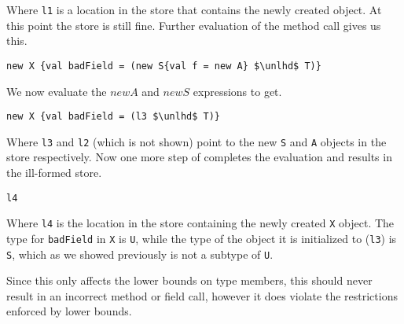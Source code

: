 \documentclass{llncs}
\numberwithin{subcase}{casethm}
\numberwithin{casethm}{theorem}
\numberwithin{casethm}{lemma}
\begin{document}
Where \texttt{l1} is a location in the store 
that contains the newly created object. At this 
point the store is still fine.
Further evaluation of the method call gives us this.
\begin{lstlisting}[mathescape, style=custom_lang]
new X {val badField = (new S{val f = new A} $\unlhd$ T)}
\end{lstlisting}
We now evaluate the $new A$ and $new S$ expressions to get.
\begin{lstlisting}[mathescape, style=custom_lang]
new X {val badField = (l3 $\unlhd$ T)}
\end{lstlisting}
Where \texttt{l3} and \texttt{l2} (which is not shown) 
point to the new \texttt{S} and \texttt{A} objects 
in the store respectively. Now one more step of completes
the evaluation and results in the ill-formed store.
\begin{lstlisting}[mathescape, style=custom_lang]
l4
\end{lstlisting}
Where \texttt{l4} is the location in the store containing 
the newly created \texttt{X} object. The type for \texttt{badField}
in \texttt{X} is \texttt{U}, while the type of the object 
it is initialized to (\texttt{l3}) is \texttt{S}, which as we showed 
previously is not a subtype of \texttt{U}.

Since this only affects the lower bounds on type members, 
this should never result in an incorrect method or field call, 
however it does violate the restrictions enforced by lower bounds.
\end{document}
